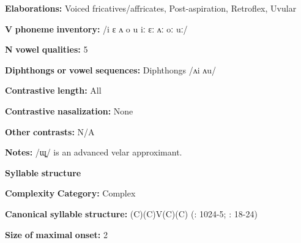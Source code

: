 \begin{styleBody}
\textbf{Elaborations:} Voiced fricatives/affricates, Post-aspiration, Retroflex, Uvular
\end{styleBody}

\begin{styleBody}
\textbf{V} \textbf{phoneme} \textbf{inventory:} /i ɛ ʌ o u iː ɛː ʌː oː uː/
\end{styleBody}

\begin{styleBody}
\textbf{N} \textbf{vowel} \textbf{qualities:} 5
\end{styleBody}

\begin{styleBody}
\textbf{Diphthongs} \textbf{or} \textbf{vowel} \textbf{sequences:} Diphthongs /ʌi ʌu/
\end{styleBody}

\begin{styleBody}
\textbf{Contrastive} \textbf{length:} All
\end{styleBody}

\begin{styleBody}
\textbf{Contrastive} \textbf{nasalization:} None
\end{styleBody}

\begin{styleBody}
\textbf{Other} \textbf{contrasts:} N/A
\end{styleBody}

\begin{styleBody}
\textbf{Notes:} /ɰ̟/ is an advanced velar approximant.
\end{styleBody}

\begin{styleBody}
\textbf{Syllable} \textbf{structure}
\end{styleBody}

\begin{styleBody}
\textbf{Complexity} \textbf{Category:} Complex
\end{styleBody}

\begin{styleBody}
\textbf{Canonical} \textbf{syllable} \textbf{structure:} (C)(C)V(C)(C) (\citealt{Anderson1997}: 1024-5; \citealt{Yoshioka2012}: 18-24)
\end{styleBody}

\begin{styleBody}
\textbf{Size} \textbf{of} \textbf{maximal} \textbf{onset:} 2
\end{styleBody}

